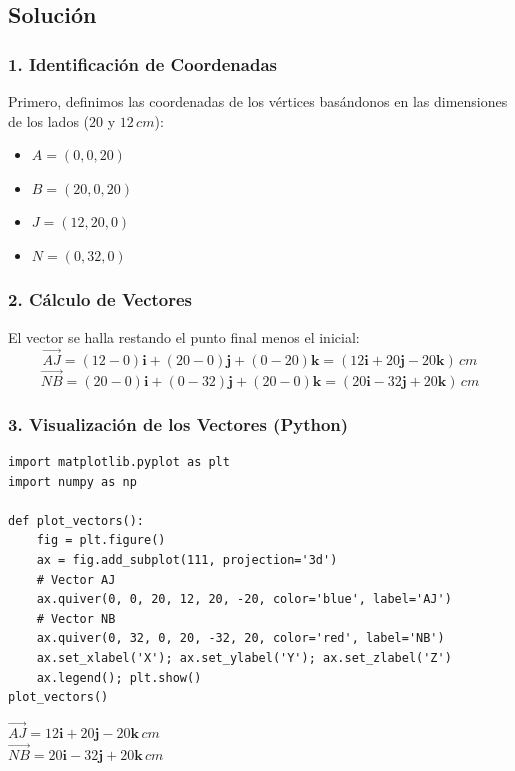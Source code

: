 \documentclass[12pt, a4paper]{article}
\begin{document}
\subsection*{Solución}

\subsubsection*{1. Identificación de Coordenadas}
Primero, definimos las coordenadas de los vértices basándonos en las dimensiones de los lados ($20$ y $12\,\si{cm}$):
\begin{itemize}
    \item $A = (0, 0, 20)$
    \item $B = (20, 0, 20)$
    \item $J = (12, 20, 0)$
    \item $N = (0, 32, 0)$
\end{itemize}

\subsubsection*{2. Cálculo de Vectores}
El vector se halla restando el punto final menos el inicial:
\begin{equation*}
    \vec{AJ} = (12-0)\mathbf{i} + (20-0)\mathbf{j} + (0-20)\mathbf{k} = (12\mathbf{i} + 20\mathbf{j} - 20\mathbf{k}) \, \si{cm} \text{}
\end{equation*}
\begin{equation*}
    \vec{NB} = (20-0)\mathbf{i} + (0-32)\mathbf{j} + (20-0)\mathbf{k} = (20\mathbf{i} - 32\mathbf{j} + 20\mathbf{k}) \, \si{cm} \text{}
\end{equation*}

\subsubsection*{3. Visualización de los Vectores (Python)}
\begin{lstlisting}
import matplotlib.pyplot as plt
import numpy as np

def plot_vectors():
    fig = plt.figure()
    ax = fig.add_subplot(111, projection='3d')
    # Vector AJ
    ax.quiver(0, 0, 20, 12, 20, -20, color='blue', label='AJ')
    # Vector NB
    ax.quiver(0, 32, 0, 20, -32, 20, color='red', label='NB')
    ax.set_xlabel('X'); ax.set_ylabel('Y'); ax.set_zlabel('Z')
    ax.legend(); plt.show()
plot_vectors()
\end{lstlisting}

\begin{tcolorbox}[colback=green!5, colframe=green!50!black, title=Respuesta Final]
$\vec{AJ} = 12\mathbf{i} + 20\mathbf{j} - 20\mathbf{k} \, \si{cm}$ \\
$\vec{NB} = 20\mathbf{i} - 32\mathbf{j} + 20\mathbf{k} \, \si{cm}$
\end{tcolorbox}
\end{document}

